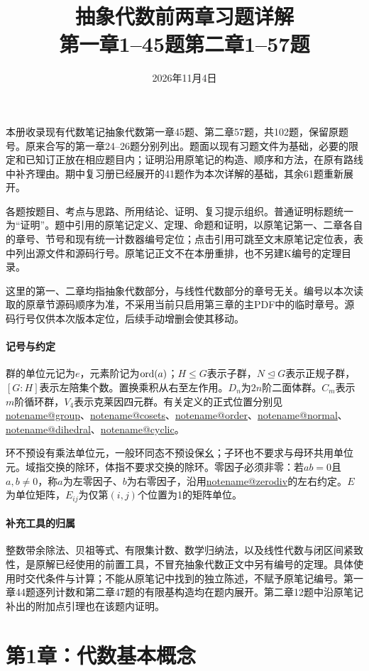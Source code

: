 \documentclass[UTF8,a4paper,11pt,fontset=windows]{ctexart}
\title{抽象代数前两章习题详解\\\large 第一章1--45题\quad 第二章1--57题}
\author{}\date{2026年11月4日}
\makeatletter
\newcommand{\noteref}[1]{\hyperref[note:#1]{\csname notename@#1\endcsname}}
\makeatother
\begin{document}
\maketitle
本册收录现有代数笔记抽象代数第一章45题、第二章57题，共102题，保留原题号。原来合写的第一章24--26题分别列出。题面以现有习题文件为基础，必要的限定和已知订正放在相应题目内；证明沿用原笔记的构造、顺序和方法，在原有路线中补齐理由。期中复习册已经展开的41题作为本次详解的基础，其余61题重新展开。

各题按题目、考点与思路、所用结论、证明、复习提示组织。普通证明标题统一为“证明”。题中引用的原笔记定义、定理、命题和证明，以原笔记第一、二章各自的章号、节号和现有统一计数器编号定位；点击引用可跳至文末原笔记定位表，表中列出源文件和源码行号。原笔记正文不在本册重排，也不另建K编号的定理目录。

这里的第一、二章均指抽象代数部分，与线性代数部分的章号无关。编号以本次读取的原章节源码顺序为准，不采用当前只启用第三章的主PDF中的临时章号。源码行号仅供本次版本定位，后续手动增删会使其移动。

\paragraph{记号与约定}
群的单位元记为$e$，元素阶记为$\operatorname{ord}(a)$；$H\leq G$表示子群，$N\trianglelefteq G$表示正规子群，$[G:H]$表示左陪集个数。置换乘积从右至左作用。$D_n$为$2n$阶二面体群。$C_m$表示$m$阶循环群，$V_4$表示克莱因四元群。有关定义的正式位置分别见\noteref{group}、\noteref{cosets}、\noteref{order}、\noteref{normal}、\noteref{dihedral}、\noteref{cyclic}。

环不预设有乘法单位元，一般环同态不预设保幺；子环也不要求与母环共用单位元。域指交换的除环，体指不要求交换的除环。零因子必须非零：若$ab=0$且$a,b\ne0$，称$a$为左零因子、$b$为右零因子，沿用\noteref{zerodiv}的左右约定。$E$为单位矩阵，$E_{ij}$为仅第$(i,j)$个位置为1的矩阵单位。

\paragraph{补充工具的归属}
整数带余除法、贝祖等式、有限集计数、数学归纳法，以及线性代数与闭区间紧致性，是原解已经使用的前置工具，不冒充抽象代数正文中另有编号的定理。具体使用时交代条件与计算；不能从原笔记中找到的独立陈述，不赋予原笔记编号。第一章44题逐列计数和第二章47题的有限基构造均在题内展开。第二章12题中沿原笔记补出的附加点引理也在该题内证明。

\tableofcontents\clearpage

\clearpage\section{第1章：代数基本概念}
\end{document}
